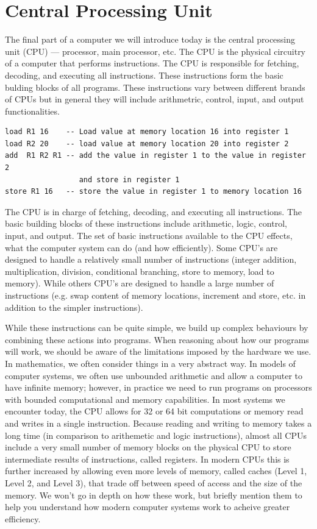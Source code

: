 \section {Central Processing Unit}

The final part of a computer we will introduce today is the central processing
unit (CPU) --- processor, main processor, etc. The CPU is the physical
circuitry of a computer that performs instructions. The CPU is responsible for
fetching, decoding, and executing all instructions. These instructions form the
basic bulding blocks of all programs. These instructions vary between different
brands of CPUs but in general they will include arithmetric, control, input, and
output functionalities.

\begin{example}
\begin{verbatim}
load R1 16    -- Load value at memory location 16 into register 1
load R2 20    -- load value at memory location 20 into register 2
add  R1 R2 R1 -- add the value in register 1 to the value in register 2
                 and store in register 1
store R1 16   -- store the value in register 1 to memory location 16
\end{verbatim}
\end{example}


The CPU is in charge of fetching, decoding, and
executing all instructions. The basic building blocks of these instructions include arithmetic, logic,
control, input, and output. The set of basic instructions available to the CPU effects, what the computer
system can do (and how efficiently). Some CPU's are designed to handle a relatively small number of
instructions (integer addition, multiplication, division, conditional branching, store to memory, load
to memory). While others CPU's are designed to handle a large number of instructions (e.g. swap content
of memory locations, increment and store, etc. in addition to the simpler instructions).

While these instructions can be quite simple, we build up complex behaviours by combining these actions
into programs. When reasoning about how our programs will work, we should be aware of the limitations
imposed by the hardware we use. In mathematics, we often consider things in a very abstract way. In models
of computer systems, we often use unbounded arithmetic and allow a computer to have infinite memory; however,
in practice we need to run programs on processors with bounded computational and memory capabilities. In most
systems we encounter today, the CPU allows for 32 or 64 bit computations or memory read and writes in a single
instruction. Because reading and writing to memory takes a long time (in comparison to arithemetic and logic
instructions), almost all CPUs include a very small number of memory blocks on the physical CPU to store
intermediate results of instructions, called registers. In modern CPUs this is further increased by allowing
even more levels of memory, called caches (Level 1, Level 2, and Level 3), that trade off between speed of access
and the size of the memory. We won't go in depth on how these work, but briefly mention them to help you
understand how modern computer systems work to acheive greater efficiency.
